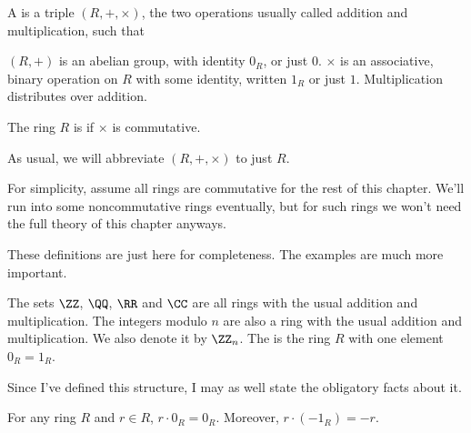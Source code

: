 \begin{definition}
	A  is a triple $(R, +, \times)$,
	the two operations usually called addition and multiplication, such that
	\begin{enumerate}[(i)]
		\ii $(R,+)$ is an abelian group, with identity $0_R$, or just $0$.
		\ii $\times$ is an associative, binary operation on $R$ with some
		identity, written $1_R$ or just $1$.
		\ii Multiplication distributes over addition.
	\end{enumerate}
	The ring $R$ is  if $\times$ is commutative.
\end{definition}
\begin{abuse}
	As usual, we will abbreviate $(R, +, \times)$ to just $R$.
\end{abuse}
\begin{abuse}
	For simplicity, assume all rings are commutative
	for the rest of this chapter.
	We'll run into some noncommutative rings eventually,
	but for such rings we won't need the full theory of this chapter anyways.
\end{abuse}

These definitions are just here for completeness.
The examples are much more important.
\begin{example}
	\listhack
	\begin{enumerate}[(a)]
		\ii The sets $\ZZ$, $\QQ$, $\RR$ and $\CC$ are all rings
		with the usual addition and multiplication.
		\ii The integers modulo $n$ are also a ring
		with the usual addition and multiplication.
		We also denote it by $\Zc n$.
		\ii The  is the ring $R$ with one element $0_R = 1_R$.
	\end{enumerate}
\end{example}

Since I've defined this structure, I may as well state the obligatory facts about it.
\begin{fact}
	For any ring $R$ and $r \in R$, $r \cdot 0_R = 0_R$.
	Moreover, $r \cdot (-1_R) = -r$.
\end{fact}

